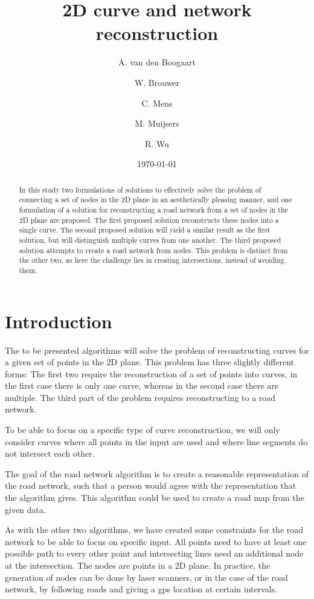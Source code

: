 \documentclass[11pt]{article}
\title{2D curve and network reconstruction}
\author{
A. van den Boogaart \and
W. Brouwer \and
C. Mens \and
M. Muijsers \and
R. Wu
}
\date{\today}
\begin{document}
\newpage

\maketitle

\begin{abstract}
In this study  two formulations of solutions to effectively solve the problem of connecting a set of nodes in the 2D plane in an aesthetically pleasing manner, and one formulation of a solution for reconstructing a road network from a set of nodes in the 2D plane are proposed.
The first proposed solution reconstructs these nodes into a single curve.
The second proposed solution will yield a similar result as the first solution, but will distinguish multiple curves from one another.
The third proposed solution attempts to create a road network from nodes. This problem is distinct from the other two, as here the challenge lies in creating intersections, instead of avoiding them.

\end{abstract}

\section{Introduction}
\label{se:introduction}
The to be presented algorithms will solve the problem of reconstructing curves for a given set of points in the 2D plane. This problem has three slightly different forms: The first two require the reconstruction of a set of points into curves, in the first case there is only one curve, whereas in the second case there are multiple. The third part of the problem requires reconstructing to a road network.

To be able to focus on a specific type of curve reconstruction, we will only consider curves where all points in the input are used and where line segments do not intersect each other.

The goal of the road network algorithm is to create a reasonable representation of the road network, such that a person would agree with the representation that the algorithm gives. This algorithm could be used to create a road map from the given data.

As with the other two algorithms, we have created some constraints for the road network to be able to focus on specific input. All points need to have at least one possible path to every other point and intersecting lines need an additional node at the intersection. The nodes are points in a 2D plane. In practice, the generation of nodes can be done by laser scanners, or in the case of the road network, by following roads and giving a gps location at certain intervals. 
\end{document}
